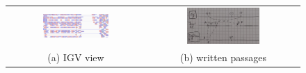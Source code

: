 \begin{figure}[H]
\begin{tabular}{cc}
  \includegraphics[width=0.5\textwidth]{pos3.PNG} &   \includegraphics[width=0.5\textwidth]{pos3passages.jpg} \\
(a) IGV view & (b) written passages \\[6pt]
\end{tabular}
\caption{}
\label{fig:ex_3}
\end{figure}



